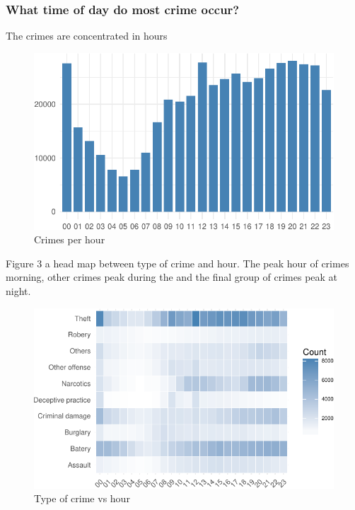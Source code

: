 \documentclass[]{article}
\begin{document}
\subsubsection{What time of day do most crime
occur?}\label{what-time-of-day-do-most-crime-occur}

The crimes are concentrated in hours

\begin{figure}[H]

{\centering \includegraphics{Assessment_1v12_files/figure-latex/fig3-1} 

}

\caption{Crimes per hour}\label{fig:fig3}
\end{figure}

Figure 3 a head map between type of crime and hour. The peak hour of
crimes morning, other crimes peak during the and the final group of
crimes peak at night.

\begin{figure}[H]

{\centering \includegraphics{Assessment_1v12_files/figure-latex/fig9-1} 

}

\caption{Type of crime vs hour}\label{fig:fig9}
\end{figure}
\end{document}
